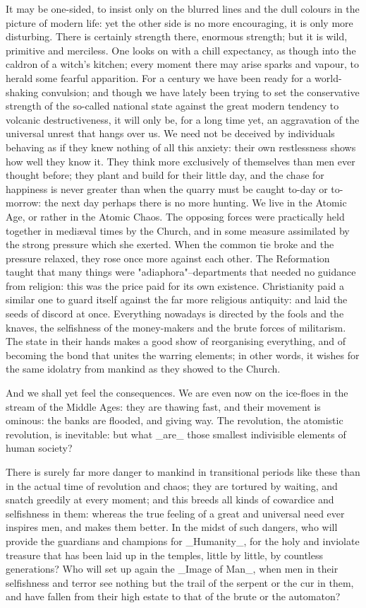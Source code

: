 It may be one-sided, to insist only on the blurred lines and the dull
colours in the picture of modern life: yet the other side is no more
encouraging, it is only more disturbing. There is certainly strength
there, enormous strength; but it is wild, primitive and merciless.
One looks on with a chill expectancy, as though into the caldron of a
witch's kitchen; every moment there may arise sparks and vapour, to
herald some fearful apparition. For a century we have been ready for
a world-shaking convulsion; and though we have lately been trying to
set the conservative strength of the so-called national state against
the great modern tendency to volcanic destructiveness, it will only
be, for a long time yet, an aggravation of the universal unrest that
hangs over us. We need not be deceived by individuals behaving as if
they knew nothing of all this anxiety: their own restlessness shows
how well they know it. They think more exclusively of themselves than
men ever thought before; they plant and build for their little day,
and the chase for happiness is never greater than when the quarry
must be caught to-day or to-morrow: the next day perhaps there is no
more hunting. We live in the Atomic Age, or rather in the Atomic
Chaos. The opposing forces were practically held together in mediæval
times by the Church, and in some measure assimilated by the strong
pressure which she exerted. When the common tie broke and the
pressure relaxed, they rose once more against each other. The
Reformation taught that many things were "adiaphora"--departments
that needed no guidance from religion: this was the price paid for
its own existence. Christianity paid a similar one to guard itself
against the far more religious antiquity: and laid the seeds of
discord at once. Everything nowadays is directed by the fools and the
knaves, the selfishness of the money-makers and the brute forces of
militarism. The state in their hands makes a good show of
reorganising everything, and of becoming the bond that unites the
warring elements; in other words, it wishes for the same idolatry
from mankind as they showed to the Church.

And we shall yet feel the consequences. We are even now on the
ice-floes in the stream of the Middle Ages: they are thawing fast,
and their movement is ominous: the banks are flooded, and giving way.
The revolution, the atomistic revolution, is inevitable: but what
_are_ those smallest indivisible elements of human society?

There is surely far more danger to mankind in transitional periods
like these than in the actual time of revolution and chaos; they are
tortured by waiting, and snatch greedily at every moment; and this
breeds all kinds of cowardice and selfishness in them: whereas the
true feeling of a great and universal need ever inspires men, and
makes them better. In the midst of such dangers, who will provide the
guardians and champions for _Humanity_, for the holy and inviolate
treasure that has been laid up in the temples, little by little, by
countless generations? Who will set up again the _Image of Man_, when
men in their selfishness and terror see nothing but the trail of the
serpent or the cur in them, and have fallen from their high estate to
that of the brute or the automaton?

